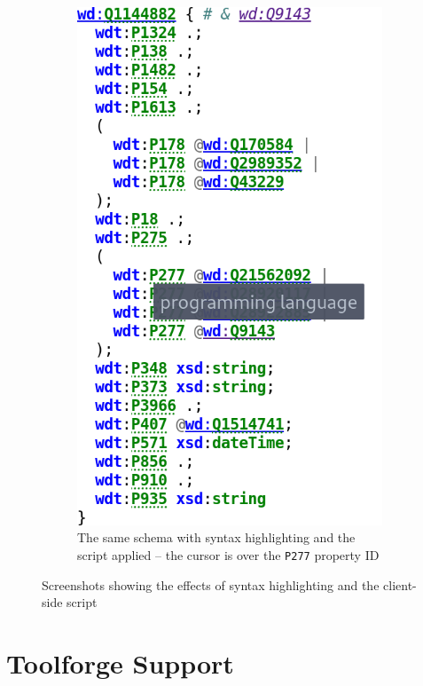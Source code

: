 \begin{figure}[t]
\begin{subfigure}[t]{0.45\textwidth}
    \includegraphics[trim={0 2.5cm 0 0},clip]{screenshots/shexc-with-syntax-highlighting}
    \caption[The same \gls{schema} with syntax highlighting and the script applied]{
      The same \gls{schema} with syntax highlighting and the script applied –
      the cursor is over the \lstinline{P277} \gls{property ID}
    }
    \label{fig:shexc-syntax-highlighting-with}
  \end{subfigure}
  \caption{
    Screenshots showing the effects of syntax highlighting and the client-side script
  }
  \label{fig:shexc-syntax-highlighting}
\end{figure}

\section{Toolforge Support}
\label{sec:wdsi:Toolforge}

